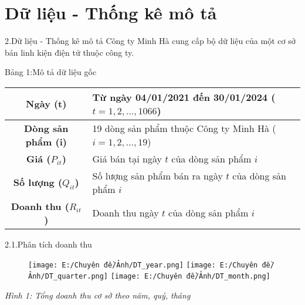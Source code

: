 \documentclass{beamer}
\begin{document}
  \section{Dữ liệu - Thống kê mô tả}
	\begin{frame}{2.Dữ liệu - Thống kê mô tả}
       Công ty Minh Hà cung cấp bộ dữ liệu của một cơ sở bán linh kiện điện tử thuộc công ty.
			\begin{table}[h]
				\centering
				   Bảng 1:Mô tả dữ liệu gốc
				
				   \begin{tabularx}{\textwidth}{|c|X|}
				    	\hline
				    	\textbf{Ngày (t)} & Từ ngày 04/01/2021 đến 30/01/2024 ($t = 1,2,\ldots,1066$) \\ \hline
					    \textbf{Dòng sản phẩm (i)} & 19 dòng sản phẩm thuộc Công ty Minh Hà ($i = 1,2,\ldots,19$) \\ \hline
					    
					    \textbf{Giá ($P_{it}$)} & Giá bán tại ngày $t$ của dòng sản phẩm $i$ \\ \hline
					    \textbf{Số lượng ($Q_{it}$)} & Số lượng sản phẩm bán ra ngày $t$ của dòng sản phẩm $i$ \\ \hline
					    \textbf{Doanh thu ($R_{it}$)} & Doanh thu ngày $t$ của dòng sản phẩm $i$ \\ \hline
				   \end{tabularx}
				   
			
			\end{table}
	\end{frame}
	
	\begin{frame}{2.1.Phân tích doanh thu}
		\begin{figure}
			\centering
			\texttt{[image: E:/Chuyên đề/Ảnh/DT\_year.png]}
			\hfill
			\texttt{[image: E:/Chuyên đề/Ảnh/DT\_quarter.png]}
			\hfill
			\texttt{[image: E:/Chuyên đề/Ảnh/DT\_month.png]}
		\end{figure}
		\vspace{0.01cm}
		\centering
		\textit{Hình 1: Tổng doanh thu cơ sở theo năm, quý, tháng  }
	\end{frame}
	
\end{document}
